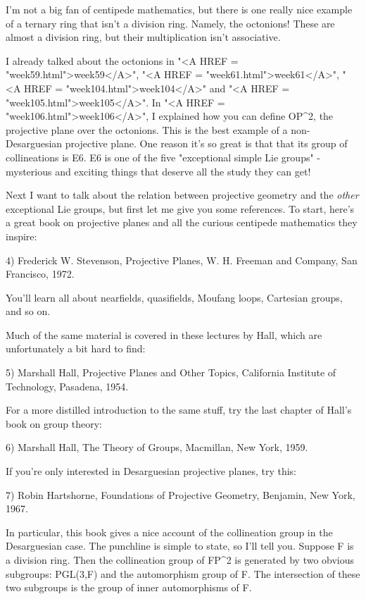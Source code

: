 I'm not a big fan of centipede mathematics, but there is one really
nice example of a ternary ring that isn't a division ring.  Namely, 
the octonions!  These are almost a division ring, but their multiplication 
isn't associative.  

I already talked about the octonions in "<A HREF = "week59.html">week59</A>", "<A HREF = "week61.html">week61</A>", "<A HREF = "week104.html">week104</A>"
and "<A HREF = "week105.html">week105</A>".  In "<A HREF = "week106.html">week106</A>", I explained how you can define OP^{2}, the
projective plane over the octonions.  This is the best example of a
non-Desarguesian projective plane.  One reason it's so great is that
that its group of collineations is E6.  E6 is one of the five
"exceptional simple Lie groups" - mysterious and exciting things that
deserve all the study they can get!   

Next I want to talk about the relation between projective geometry
and the \emph{other} exceptional Lie groups, but first let me give you
some references.  To start, here's a great book on projective planes 
and all the curious centipede mathematics they inspire: 

4) Frederick W. Stevenson, Projective Planes, W. H. Freeman and Company,
San Francisco, 1972.

You'll learn all about nearfields, quasifields, Moufang loops, Cartesian 
groups, and so on.  

Much of the same material is covered in these lectures by Hall,
which are unfortunately a bit hard to find:

5) Marshall Hall, Projective Planes and Other Topics, California
Institute of Technology, Pasadena, 1954.   

For a more distilled introduction to the same stuff, 
try the last chapter of Hall's book on group theory:

6) Marshall Hall, The Theory of Groups, Macmillan, New York, 1959.

If you're only interested in Desarguesian projective planes, try
this:

7) Robin Hartshorne, Foundations of Projective Geometry, Benjamin, 
New York, 1967. 

In particular, this book gives a nice account of the collineation group 
in the Desarguesian case.  The punchline is simple to state, so I'll 
tell you.  Suppose F is a division ring.  Then the collineation 
group of FP^{2} is generated by two obvious subgroups: PGL(3,F) and 
the automorphism group of F.  The intersection of these two subgroups 
is the group of inner automorphisms of F.  


